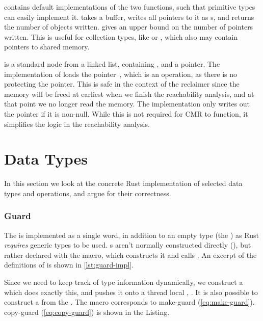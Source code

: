 \begin{figure}[ht]
  
\end{figure}

 contains default implementations of the two functions, such that primitive types can
easily implement it.  takes a buffer, writes all pointers to it as s,
and returns the number of objects written.  gives an upper bound on the number of
pointers written. This is useful for collection types, like  or , which
also may contain pointers to shared memory.

 is a standard node from a linked list, containing , and a 
pointer. The implementation of  loads the  pointer~, which is
an  operation, as there is no  protecting the pointer. This is safe in the
context of the reclaimer since the memory will be freed at earliest when we finish the reachability
analysis, and at that point we no longer read the memory. The implementation only writes out the
pointer if it is non-null. While this is not required for CMR to function, it simplifies the logic
in the reachability analysis.


\section{Data Types\label{sec:data-types}}

In this section we look at the concrete Rust implementation of selected data types and operations,
and argue for their correctness.


\subsubsection{Guard}

The  is implemented as a single word, in addition to an empty type (the
) as Rust \emph{requires} generic types to be used. s aren't normally
constructed directly (), but rather declared with the
 macro, which constructs it and calls .
An excerpt of the definitions of  is shown in \cref{lst:guard-impl}.




Since we need to keep track of type information dynamically, we construct a 
which does exactly this, and pushes it onto a thread local , .  It is also
possible to construct a  from the .  The  macro corresponds
to make-guard (\cref{eq:make-guard}). copy-guard (\cref{eq:copy-guard}) is shown in the Listing.

